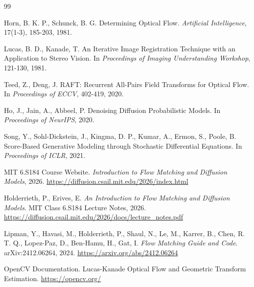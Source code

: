 \documentclass[12pt,a4paper]{article}
\begin{document}
\begin{thebibliography}{99}

Horn, B. K. P., Schunck, B. G.
\newblock Determining Optical Flow.
\newblock \emph{Artificial Intelligence}, 17(1-3), 185-203, 1981.

Lucas, B. D., Kanade, T.
\newblock An Iterative Image Registration Technique with an Application to Stereo Vision.
\newblock In \emph{Proceedings of Imaging Understanding Workshop}, 121-130, 1981.

Teed, Z., Deng, J.
\newblock RAFT: Recurrent All-Pairs Field Transforms for Optical Flow.
\newblock In \emph{Proceedings of ECCV}, 402-419, 2020.

Ho, J., Jain, A., Abbeel, P.
\newblock Denoising Diffusion Probabilistic Models.
\newblock In \emph{Proceedings of NeurIPS}, 2020.

Song, Y., Sohl-Dickstein, J., Kingma, D. P., Kumar, A., Ermon, S., Poole, B.
\newblock Score-Based Generative Modeling through Stochastic Differential Equations.
\newblock In \emph{Proceedings of ICLR}, 2021.

MIT 6.S184 Course Website.
\newblock \emph{Introduction to Flow Matching and Diffusion Models}, 2026.
\newblock \url{https://diffusion.csail.mit.edu/2026/index.html}

Holderrieth, P., Erives, E.
\newblock \emph{An Introduction to Flow Matching and Diffusion Models}.
\newblock MIT Class 6.S184 Lecture Notes, 2026.
\newblock \url{https://diffusion.csail.mit.edu/2026/docs/lecture_notes.pdf}

Lipman, Y., Havasi, M., Holderrieth, P., Shaul, N., Le, M., Karrer, B., Chen, R. T. Q., Lopez-Paz, D., Ben-Hamu, H., Gat, I.
\newblock \emph{Flow Matching Guide and Code}.
\newblock arXiv:2412.06264, 2024.
\newblock \url{https://arxiv.org/abs/2412.06264}

OpenCV Documentation.
\newblock Lucas-Kanade Optical Flow and Geometric Transform Estimation.
\newblock \url{https://opencv.org/}

\end{thebibliography}
\end{document}
